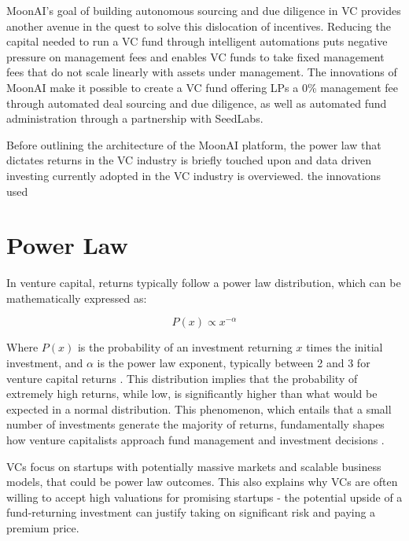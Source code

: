 \documentclass[a4paper, oneside]{discothesis}
\begin{document}
MoonAI's goal of building autonomous sourcing and due diligence in VC provides another avenue in the quest to solve this dislocation of incentives. Reducing the capital needed to run a VC fund through intelligent automations puts negative pressure on management fees and enables VC funds to take fixed management fees that do not scale linearly with assets under management. The innovations of MoonAI make it possible to create a VC fund offering LPs a 0\% management fee through automated deal sourcing and due diligence, as well as automated fund administration through a partnership with SeedLabs. 

Before outlining the architecture of the MoonAI platform, the power law that dictates returns in the VC industry is briefly touched upon and data driven investing currently adopted in the VC industry is overviewed.  the innovations used 

\section{Power Law}

In venture capital, returns typically follow a power law distribution, which can be mathematically expressed as:

\begin{equation}
P(x) \propto x^{-\alpha}
\end{equation}

Where $P(x)$ is the probability of an investment returning $x$ times the initial investment, and $\alpha$ is the power law exponent, typically between 2 and 3 for venture capital returns \cite{clauset2009power}. This distribution implies that the probability of extremely high returns, while low, is significantly higher than what would be expected in a normal distribution. This phenomenon, which entails that a small number of investments generate the majority of returns, fundamentally shapes how venture capitalists approach fund management and investment decisions \cite{peter2015power}.

VCs focus on startups with potentially massive markets and scalable business models, that could be power law outcomes. This also explains why VCs are often willing to accept high valuations for promising startups - the potential upside of a fund-returning investment can justify taking on significant risk and paying a premium price.
\end{document}
